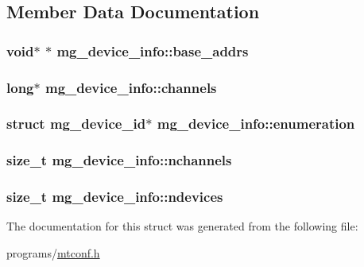 \subsection{Member Data Documentation}
\hypertarget{structmg__device__info_aad84e3fbce68ce91f40e77f07d537ea7}{
\subsubsection[{base\+\_\+addrs}]{\setlength{\rightskip}{0pt plus 5cm}void$\ast$ $\ast$ mg\+\_\+device\+\_\+info\+::base\+\_\+addrs}}\label{structmg__device__info_aad84e3fbce68ce91f40e77f07d537ea7}
\hypertarget{structmg__device__info_a809d69dd9ca1e776ff80b2ba5197d2fe}{
\subsubsection[{channels}]{\setlength{\rightskip}{0pt plus 5cm}long$\ast$ mg\+\_\+device\+\_\+info\+::channels}}\label{structmg__device__info_a809d69dd9ca1e776ff80b2ba5197d2fe}
\hypertarget{structmg__device__info_a22c8bc3d47e3c4c9964ef5bae6658ff5}{
\subsubsection[{enumeration}]{\setlength{\rightskip}{0pt plus 5cm}struct {\bf mg\+\_\+device\+\_\+id}$\ast$ mg\+\_\+device\+\_\+info\+::enumeration}}\label{structmg__device__info_a22c8bc3d47e3c4c9964ef5bae6658ff5}
\hypertarget{structmg__device__info_a5298d88d4e8e074dd36bcef94a9ed699}{
\subsubsection[{nchannels}]{\setlength{\rightskip}{0pt plus 5cm}size\+\_\+t mg\+\_\+device\+\_\+info\+::nchannels}}\label{structmg__device__info_a5298d88d4e8e074dd36bcef94a9ed699}
\hypertarget{structmg__device__info_a3a4739cbdca1cb830da50f0f9e564c69}{
\subsubsection[{ndevices}]{\setlength{\rightskip}{0pt plus 5cm}size\+\_\+t mg\+\_\+device\+\_\+info\+::ndevices}}\label{structmg__device__info_a3a4739cbdca1cb830da50f0f9e564c69}


The documentation for this struct was generated from the following file\+:\begin{DoxyCompactItemize}
\item 
programs/\hyperlink{mtconf_8h}{mtconf.\+h}\end{DoxyCompactItemize}
